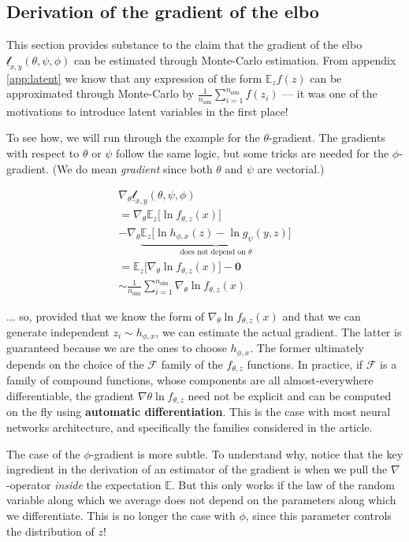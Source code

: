 \documentclass{article}
\begin{document}
\begin{appendix}
\begin{multicols}{2}
\subsection{Derivation of the gradient of the \gls{elbo}} \label{app:elbderivative}

This section provides substance to the claim that the gradient of the \gls{elbo} $\underline{\mathscr{l}}_{x,y}(\theta,\psi,\phi)$ can be estimated through Monte-Carlo estimation. From appendix \ref{app:latent} we know that any expression of the form $\mathbb{E}_zf(z)$ can be approximated through Monte-Carlo by $\frac{1}{n_\text{sim}}\sum_{i=1}^{n_\text{sim}} f(z_i)$ — it was one of the motivations to introduce latent variables in the first place!

To see how, we will run through the example for the $\theta$-gradient. The gradients with respect to $\theta$ or $\psi$ follow the same logic, but some tricks are needed for the $\phi$-gradient. (We do mean \textit{gradient} since both $\theta$ and $\psi$ are vectorial.)

\begin{gather*}
\nabla_\theta\underline{\mathscr{l}}_{x,y}(\theta,\psi,\phi) \\
= \nabla_\theta \mathbb{E}_{z} \big[ \ln f_{\theta,z}(x) \big] \\
- \nabla_\theta\underbrace{\mathbb{E}_{z}\Big[\ln h_{\phi,x}(z) - \ln g_\psi(y,z)  \Big]}_{\text{does not depend on }\theta} \\
= \mathbb{E}_{z} \big[ \nabla_\theta \ln f_{\theta,z}(x) \big]-\mathbf{0} \\
\sim \frac{1}{n_\text{sim}}\sum_{i=1}^{n_\text{sim}} \nabla_\theta \ln f_{\theta,z}(x)
\end{gather*}

... so, provided that we know the form of $\nabla_\theta \ln f_{\theta,z}(x)$ and that we can generate independent $z_i\sim h_{\phi,x}$, we can estimate the actual gradient. The latter is guaranteed because we are the ones to choose $h_{\phi,x}$. The former ultimately depends on the choice of the $\mathcal{F}$ family of the $f_{\theta,z}$ functions. In practice, if $\mathcal{F}$ is a family of compound functions, whose components are all almost-everywhere differentiable, the gradient $\nabla \theta \ln f_{\theta,z}$ need not be explicit and can be computed on the fly using \textbf{automatic differentiation}. This is the case with most neural networks architecture, and specifically the families considered in the article.

The case of the $\phi$-gradient is more subtle. To understand why, notice that the key ingredient in the derivation of an estimator of the gradient is when we pull the $\nabla$-operator \textit{inside} the expectation $\mathbb{E}$. But this only works if the law of the random variable along which we average does not depend on the parameters along which we differentiate. This is no longer the case with $\phi$, since this parameter controls the distribution of $z$!


\end{multicols}
\end{appendix}
\end{document}
